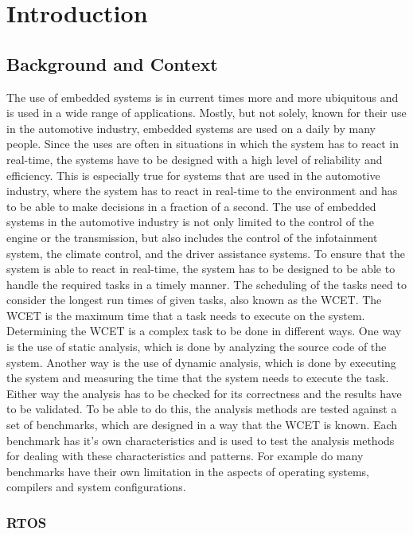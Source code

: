 \chapter{Introduction}\label{ch:introduction}
\section{Background and Context}\label{sec:background}
The use of embedded systems is in current times more and more ubiquitous and is used in a wide range of applications. 
Mostly, but not solely, known for their use in the automotive industry, embedded systems are used on a daily by many people.
Since the uses are often in situations in which the system has to react in real-time, the systems have to be designed with a high level of reliability and efficiency.
This is especially true for systems that are used in the automotive industry, where the system has to react in real-time to the environment and has to be able to make decisions in a fraction of a second.
The use of embedded systems in the automotive industry is not only limited to the control of the engine or the transmission, but also includes the control of the infotainment system, the climate control, and the driver assistance systems.
To ensure that the system is able to react in real-time, the system has to be designed to be able to handle the required tasks in a timely manner.
The scheduling of the tasks need to consider the longest run times of given tasks, also known as the \ac{WCET}.
The \ac{WCET} is the maximum time that a task needs to execute on the system.
Determining the \ac{WCET} is a complex task to be done in different ways.
One way is the use of static analysis, which is done by analyzing the source code of the system.
Another way is the use of dynamic analysis, which is done by executing the system and measuring the time that the system needs to execute the task.
Either way the analysis has to be checked for its correctness and the results have to be validated.
To be able to do this, the analysis methods are tested against a set of benchmarks, which are designed in a way that the \ac{WCET} is known.
Each benchmark has it's own characteristics and is used to test the analysis methods for dealing with these characteristics and patterns.
For example do many benchmarks have their own limitation in the aspects of operating systems, compilers and system configurations.\cite{falk_taclebench_2016}

\subsection{RTOS}\label{subsec:rtos}

